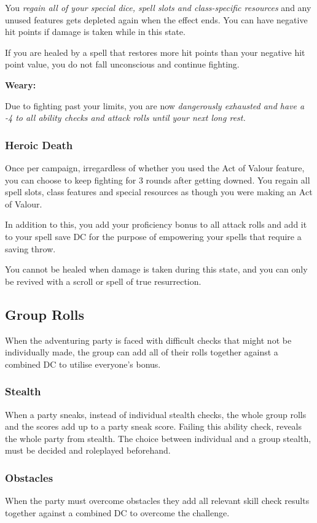 \documentclass[letterpaper,twocolumn,openany,nodeprecatedcode,breakable,skins,xparse,most]{dndbook}
\begin{document}
You \textit{regain all of your special dice, spell slots and class-specific resources} and any unused features gets depleted again when the effect ends. You can have negative hit points if damage is taken while in this state.

If you are healed by a spell that restores more hit points than your negative hit point value, you do not fall unconscious and continue fighting.

\textbf{Weary:}

Due to fighting past your limits, you are now \textit{dangerously exhausted and have a -4 to all ability checks and attack rolls until your next long rest.}

\subsubsection{Heroic Death}
Once per campaign, irregardless of whether you used the Act of Valour feature, you can choose to keep fighting for 3 rounds after getting downed. You regain all spell slots, class features and special resources as though you were making an Act of Valour.

In addition to this, you add your proficiency bonus to all attack rolls and add it to your spell save DC for the purpose of empowering your spells that require a saving throw. 

You cannot be healed when damage is taken during this state, and you can only be revived with a scroll or spell of true resurrection. 


\subsection{Group Rolls}
When the adventuring party is faced with difficult checks that might not be individually made, the group can add all of their rolls together against a combined DC to utilise everyone's bonus.

\subsubsection{Stealth}
When a party sneaks, instead of individual stealth checks, the whole group rolls and the scores add up to a party sneak score. Failing this ability check, reveals the whole party from stealth. The choice between individual and a group stealth, must be decided and roleplayed beforehand.

\subsubsection{Obstacles}
When the party must overcome obstacles they add all relevant skill check results together against a combined DC to overcome the challenge.
\end{document}
